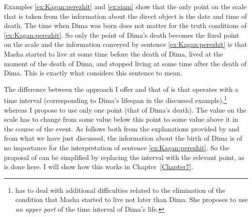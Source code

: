 Examples \ref{ex:Kagan:perezhit} and \ref{ex:siam} show that the only point on the scale that is taken from the information about the direct object is the date and time of death. The time when Dima was born does not matter for the truth conditions of \ref{ex:Kagan:perezhit}. So only the point of Dima's death becomes the fixed point on the scale and the information conveyed by sentence \ref{ex:Kagan:perezhit} is that Masha started to live at some time before the death of Dima, lived at the moment of the death of Dima, and stopped living at some time after the death of Dima. This is exactly what \citet{Kagan:book} considers this sentence to mean. 

The difference between the approach I offer and that of \citet{Kagan:book} is that \citet{Kagan:book} operates with a time interval (corresponding to Dima's lifespan in the discussed example),\footnote{\citet[143--144]{Kagan:book} has to deal with additional difficulties related to the elimination of the condition that Masha started to live not later than Dima. She proposes to use \textit{an upper part} of the time interval of Dima's life.} whereas I propose to use only one point (that of Dima's death). The value on the scale has to change from some value below this point to some value above it in the course of the event. As follows both from the explanations provided by \citet{Kagan:book} and from what we have just discussed, the information about the birth of Dima is of no importance for the interpretation of sentence \ref{ex:Kagan:perezhit}. So the proposal of \citet{Kagan:book} can be simplified by replacing the interval with the relevant point, as is done here. I will show how this works in Chapter~\ref{Chapter7}.

